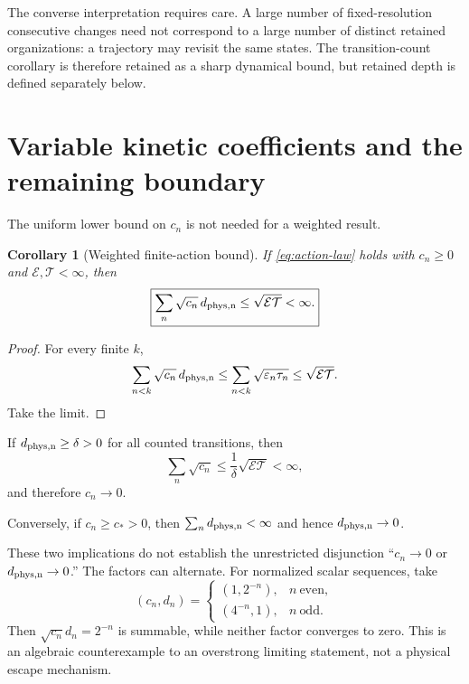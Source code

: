 \documentclass[11pt,a4paper]{article}
\newtheorem{corollary}[theorem]{Corollary}
\theoremstyle{definition}
\numberwithin{equation}{section}
\begin{document}
The converse interpretation requires care. A large number of
fixed-resolution consecutive changes need not correspond to a large number
of distinct retained organizations: a trajectory may revisit the same
states. The transition-count corollary is therefore retained as a sharp
dynamical bound, but retained depth is defined separately below.

\section{Variable kinetic coefficients and the remaining boundary}

The uniform lower bound on $c_n$ is not needed for a weighted result.

\begin{corollary}[Weighted finite-action bound]
\label{cor:weighted}
If \eqref{eq:action-law} holds with $c_n\ge0$ and
$\mathcal E,\mathcal T<\infty$, then
\begin{equation}
\boxed{
\sum_n\sqrt{c_n}\,d_{\rm phys,n}
\le\sqrt{\mathcal E\mathcal T}<\infty.
}
\label{eq:weighted-length}
\end{equation}
\end{corollary}

\begin{proof}
For every finite $k$,
\[
\sum_{n<k}\sqrt{c_n}\,d_{\rm phys,n}
\le
\sum_{n<k}\sqrt{\varepsilon_n\tau_n}
\le
\sqrt{\mathcal E\mathcal T}.
\]
Take the limit.
\end{proof}

If $d_{\rm phys,n}\ge\delta>0$ for all counted transitions, then
\begin{equation}
\sum_n\sqrt{c_n}
\le
\frac1\delta\sqrt{\mathcal E\mathcal T}<\infty,
\label{eq:coefficient-sum}
\end{equation}
and therefore $c_n\to0$.

Conversely, if $c_n\ge c_*>0$, then
$\sum_nd_{\rm phys,n}<\infty$ and hence
$d_{\rm phys,n}\to0$.

These two implications do not establish the unrestricted disjunction
``$c_n\to0$ or $d_{\rm phys,n}\to0$.'' The factors can alternate.
For normalized scalar sequences, take
\[
(c_n,d_n)=
\begin{cases}
(1,2^{-n}), & n\ \text{even},\\
(4^{-n},1), & n\ \text{odd}.
\end{cases}
\]
Then $\sqrt{c_n}d_n=2^{-n}$ is summable, while neither factor
converges to zero. This is an algebraic counterexample to an
overstrong limiting statement, not a physical escape mechanism.
\end{document}
